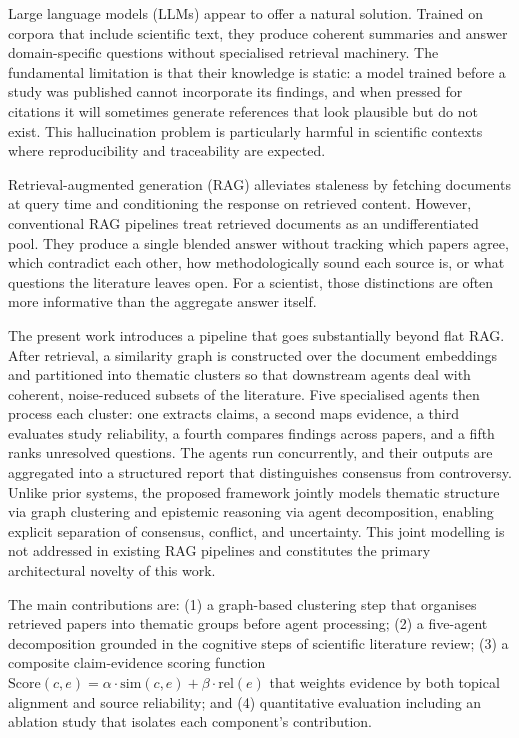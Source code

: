 \documentclass[conference]{IEEEtran}
\begin{document}
Large language models (LLMs) appear to offer a natural solution. Trained on
corpora that include scientific text, they produce coherent summaries and
answer domain-specific questions without specialised retrieval machinery. The
fundamental limitation is that their knowledge is static: a model trained
before a study was published cannot incorporate its findings, and when pressed
for citations it will sometimes generate references that look plausible but do
not exist. This hallucination problem is particularly harmful in scientific
contexts where reproducibility and traceability are expected.

Retrieval-augmented generation (RAG) alleviates staleness by fetching
documents at query time and conditioning the response on retrieved content.
However, conventional RAG pipelines treat retrieved documents as an
undifferentiated pool. They produce a single blended answer without tracking
which papers agree, which contradict each other, how methodologically sound
each source is, or what questions the literature leaves open. For a scientist,
those distinctions are often more informative than the aggregate answer
itself.

The present work introduces a pipeline that goes substantially beyond flat
RAG. After retrieval, a similarity graph is constructed over the document
embeddings and partitioned into thematic clusters so that downstream agents
deal with coherent, noise-reduced subsets of the literature. Five specialised
agents then process each cluster: one extracts claims, a second maps evidence,
a third evaluates study reliability, a fourth compares findings across papers,
and a fifth ranks unresolved questions. The agents run concurrently, and their
outputs are aggregated into a structured report that distinguishes consensus
from controversy. Unlike prior systems, the proposed framework jointly models
thematic structure via graph clustering and epistemic reasoning via agent
decomposition, enabling explicit separation of consensus, conflict, and
uncertainty. This joint modelling is not addressed in existing RAG pipelines
and constitutes the primary architectural novelty of this work.

The main contributions are: (1) a graph-based clustering step that organises
retrieved papers into thematic groups before agent processing; (2) a
five-agent decomposition grounded in the cognitive steps of scientific
literature review; (3) a composite claim-evidence scoring function
$\mathrm{Score}(c,e) = \alpha \cdot \mathrm{sim}(c,e) + \beta \cdot
\mathrm{rel}(e)$ that weights evidence by both topical alignment and source
reliability; and (4) quantitative evaluation including an ablation study that
isolates each component's contribution.
\end{document}

